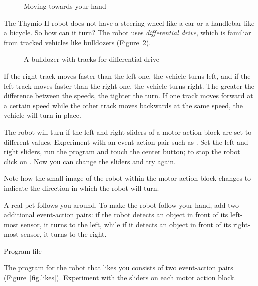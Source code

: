\begin{figure}
\begin{center}
\caption{Moving towards your hand}\label{fig.follow-hand}
\end{center}
\end{figure}



The Thymio-II robot does not have a steering wheel like a car or a
handlebar like a bicycle. So how can it turn? The robot uses
\emph{differential drive}, which is familiar from tracked vehicles like
bulldozers (Figure~\ref{fig.bull}).

\begin{figure}
\begin{center}
\caption{A bulldozer with tracks for differential drive}\label{fig.bull}
\end{center}
\end{figure}

If the right track moves faster than the left one, the vehicle turns
left, and if the left track moves faster than the right one, the vehicle
turns right. The greater the difference between the speeds, the tighter
the turn. If one track moves forward at a certain speed while the other
track moves backwards at the same speed, the vehicle will turn in place.

The robot will turn if the left and right sliders of a motor action
block are set to different values. Experiment with an event-action pair
such as . Set the left and right sliders, run the program
and touch the center button; to stop the robot click on .
Now you can change the sliders and try again.

Note how the small image of the robot within the motor action block
changes to indicate the direction in which the robot will turn.


A real pet follows you around. To make the robot follow your hand, add
two additional event-action pairs: if the robot detects an object in
front of its left-most sensor, it turns to the left, while if it detects
an object in front of its right-most sensor, it turns to the right.

{\raggedleft \hfill Program file }

The program for the robot that likes you consists of two event-action
pairs (Figure~\ref{fig.likes}). Experiment with the sliders on each
motor action block.

